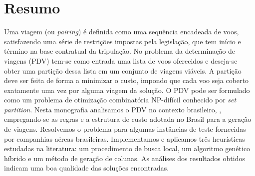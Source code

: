 \chapter*{Resumo}
\thispagestyle{empty}

Uma viagem (ou {\it pairing}) é definida como uma sequência encadeada de voos, satisfazendo uma
série de restrições impostas pela legislação, que tem início e término na base contratual da
tripulação. No problema da determinação de viagens (PDV) tem-se como entrada uma lista de voos
oferecidos e deseja-se obter uma partição dessa lista em um conjunto de viagens viáveis. A partição
deve ser feita de forma a minimizar o custo, impondo que cada voo seja coberto exatamente uma vez
por alguma viagem da solução. O PDV pode ser formulado como um problema de otimização combinatória
NP-difícil conhecido por {\it set partition}. Nesta monografia analisamos o PDV no contexto
brasileiro, \ie, empregando-se as regras e a estrutura de custo adotada no Brasil para a geração de
viagens. Resolvemos o problema para algumas instâncias de teste fornecidas por companhias aéreas
brasileiras. Implementamos e aplicamos três heurísticas estudadas na literatura: um procedimento de
busca local, um algoritmo genético híbrido e um método de geração de colunas. As análises dos 
resultados obtidos indicam uma boa qualidade das soluções encontradas.



